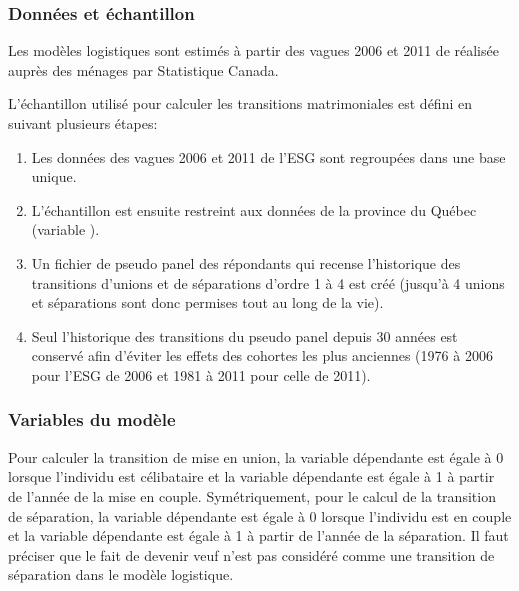 \documentclass[letterpaper,10pt,french]{sphinxmanual}
\begin{document}
\subsubsection{Données et échantillon}
\label{\detokenize{methodologie:id8}}
Les modèles logistiques sont estimés à partir des vagues 2006 et 2011 de  réalisée auprès des ménages par Statistique Canada.

L’échantillon utilisé pour calculer les transitions matrimoniales est défini en suivant plusieurs étapes:
\begin{enumerate}
%
\item {} 
Les données des vagues 2006 et 2011 de l’ESG sont regroupées dans une base unique.

\item {} 
L’échantillon est ensuite restreint aux données de la province du Québec (variable ).

\item {} 
Un fichier de pseudo panel des répondants qui recense l’historique des transitions d’unions et de séparations d’ordre 1 à 4 est créé (jusqu’à 4 unions et séparations sont donc permises tout au long de la vie).

\item {} 
Seul l’historique des transitions du pseudo panel depuis 30 années est conservé afin d’éviter les effets des cohortes les plus anciennes (1976 à 2006 pour l’ESG de 2006 et 1981 à 2011 pour celle de 2011).

\end{enumerate}


\subsubsection{Variables du modèle}
\label{\detokenize{methodologie:id10}}
Pour calculer la transition de mise en union, la variable dépendante est égale à 0 lorsque l’individu est célibataire et la variable dépendante est égale à 1 à partir de l’année de la mise en couple. Symétriquement, pour le calcul de la transition de séparation, la variable dépendante est égale à 0 lorsque l’individu est en couple et la variable dépendante est égale à 1 à partir de l’année de la séparation. Il faut préciser que le fait de devenir veuf n’est pas considéré comme une transition de séparation dans le modèle logistique.
\end{document}
